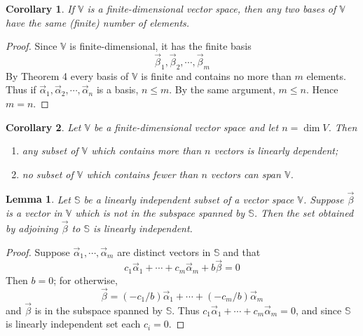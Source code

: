 \documentclass{article}
\newtheorem*{lemma}{Lemma}
\newtheorem{corollary}{Corollary}
\begin{document}
    \begin{corollary}
        If \(\mathbb{V}\) is a finite-dimensional vector space, then any two bases of
        \(\mathbb{V}\) have the same (finite) number of elements.
    \end{corollary}
    \begin{proof}
        Since \(\mathbb{V}\) is finite-dimensional, it has the finite basis
        \begin{equation*}
            {\vec{\beta}_1, \vec{\beta}_2, \cdots, \vec{\beta}_m}
        \end{equation*}
        By Theorem 4 every basis of \(\mathbb{V}\) is finite and contains no more than 
        \(m\) elements. Thus if \({\vec{\alpha}_1, \vec{\alpha}_2, \cdots, \vec{\alpha}_n}\)
        is a basis, \(n \leq m\). By the same argument, \(m \leq n\). Hence \(m=n\).
    \end{proof}
    \begin{corollary}
        Let \(\mathbb{V}\) be a finite-dimensional vector space and let \(n=\dim{V}\). Then 
        \begin{enumerate}
            \item any subset of \(\mathbb{V}\) which contains more than \(n\) vectors is linearly dependent;
            \item no subset of \(\mathbb{V}\) which contains fewer than \(n\) vectors can span \(\mathbb{V}\).
        \end{enumerate}
    \end{corollary}
    \begin{lemma}
        Let \(\mathbb{S}\) be a linearly independent subset of a vector space \(\mathbb{V}\).
        Suppose \(\vec{\beta}\) is a vector in \(\mathbb{V}\) which is not in the subspace
        spanned by \(\mathbb{S}\). Then the set obtained by adjoining \(\vec{\beta}\) to 
        \(\mathbb{S}\) is linearly independent.
    \end{lemma}
    \begin{proof}
        Suppose \(\vec{\alpha}_1, \cdots, \vec{\alpha}_m\) are distinct vectors in \(\mathbb{S}\) and that 
        \begin{equation*}
            c_1 \vec{\alpha}_1 + \cdots + c_m \vec{\alpha}_m + b \vec{\beta} = 0
        \end{equation*}
        Then \(b=0\); for otherwise,
        \begin{equation*}
            \vec{\beta} = (-c_1/b)\vec{\alpha}_1 + \cdots + (-c_m/b)\vec{\alpha}_m
        \end{equation*}
        and \(\vec{\beta}\) is in the subspace spanned by \(\mathbb{S}\). Thus 
        \(c_1 \vec{\alpha}_1 + \cdots + c_m \vec{\alpha}_m = 0\), and since \(\mathbb{S}\) 
        is linearly independent set each \(c_i=0\).
    \end{proof}
\end{document}
